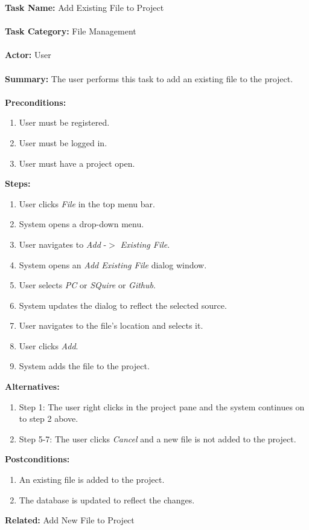 \documentclass[14pt, a4paper]{article}
\begin{document}
\begin{framed}
	\noindent\textbf{Task Name:} Add Existing File to Project \\ \\
	\textbf{Task Category:} File Management \\ \\
	\textbf{Actor:} User \\ \\
	\textbf{Summary:} The user performs this task to add an existing file to the project. \\ \\
	\textbf{Preconditions:} 
	\begin{enumerate}
		\item User must be registered.
		\item User must be logged in.
		\item User must have a project open.
	\end{enumerate}
	\textbf{Steps:}
	\begin{enumerate}
		\item User clicks \textit{File} in the top menu bar.
		\item System opens a drop-down menu.
		\item User navigates to \textit{Add} -$>$ \textit{Existing File}.
		\item System opens an \textit{Add Existing File} dialog window.
		\item User selects \textit{PC} or \textit{SQuire} or \textit{Github}.
		\item System updates the dialog to reflect the selected source.
		\item User navigates to the file's location and selects it.
		\item User clicks \textit{Add}.
		\item System adds the file to the project.
	\end{enumerate}
	\textbf{Alternatives:} 
	\begin{enumerate}
		\item Step 1: The user right clicks in the project pane and the system continues on to step 2 above.
		\item Step 5-7: The user clicks \textit{Cancel} and a new file is not added to the project.
	\end{enumerate}
	\textbf{Postconditions:}
	\begin{enumerate}
		\item An existing file is added to the project.
		\item The database is updated to reflect the changes.
	\end{enumerate}
	\textbf{Related:} Add New File to Project
\end{framed} 
\end{document}
